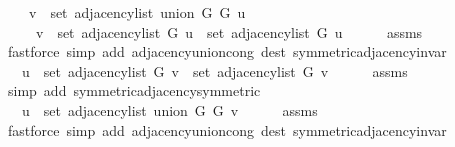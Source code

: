 \begin{isabellebody}
\isanewline
\ \ \ \ {\isachardoublequoteopen}v\ {\isasymin}\ set\ {\isacharparenleft}{\kern0pt}adjacency{\isacharunderscore}{\kern0pt}list\ {\isacharparenleft}{\kern0pt}union\ G{}\ G{}{\isacharparenright}{\kern0pt}\ u{\isacharparenright}{\kern0pt}\ {\isasymlongleftrightarrow}\isanewline
\ \ \ \ \ v\ {\isasymin}\ set\ {\isacharparenleft}{\kern0pt}adjacency{\isacharunderscore}{\kern0pt}list\ G{}\ u{\isacharparenright}{\kern0pt}\ {\isasymunion}\ set\ {\isacharparenleft}{\kern0pt}adjacency{\isacharunderscore}{\kern0pt}list\ G{}\ u{\isacharparenright}{\kern0pt}{\isachardoublequoteclose}\isanewline
\ \ \ \ \isamarkupfalse%
\ assms\isanewline
\ \ \ \ \isamarkupfalse%
\ {\isacharparenleft}{\kern0pt}fastforce\ simp\ add{\isacharcolon}{\kern0pt}\ adjacency{\isacharunderscore}{\kern0pt}union{\isacharunderscore}{\kern0pt}cong\ dest{\isacharcolon}{\kern0pt}\ symmetric{\isacharunderscore}{\kern0pt}adjacency{\isachardot}{\kern0pt}invar{\isacharparenright}{\kern0pt}\isanewline
\ \ \isamarkupfalse%
\ \isamarkupfalse%
\ {\isachardoublequoteopen}{\isachardot}{\kern0pt}{\isachardot}{\kern0pt}{\isachardot}{\kern0pt}\ {\isasymlongleftrightarrow}\ u\ {\isasymin}\ set\ {\isacharparenleft}{\kern0pt}adjacency{\isacharunderscore}{\kern0pt}list\ G{}\ v{\isacharparenright}{\kern0pt}\ {\isasymunion}\ set\ {\isacharparenleft}{\kern0pt}adjacency{\isacharunderscore}{\kern0pt}list\ G{}\ v{\isacharparenright}{\kern0pt}{\isachardoublequoteclose}\isanewline
\ \ \ \ \isamarkupfalse%
\ assms\isanewline
\ \ \ \ \isamarkupfalse%
\ {\isacharparenleft}{\kern0pt}simp\ add{\isacharcolon}{\kern0pt}\ symmetric{\isacharunderscore}{\kern0pt}adjacency{\isachardot}{\kern0pt}symmetric{\isacharparenright}{\kern0pt}\isanewline
\ \ \isamarkupfalse%
\ \isamarkupfalse%
\ {\isachardoublequoteopen}{\isachardot}{\kern0pt}{\isachardot}{\kern0pt}{\isachardot}{\kern0pt}\ {\isasymlongleftrightarrow}\ u\ {\isasymin}\ set\ {\isacharparenleft}{\kern0pt}adjacency{\isacharunderscore}{\kern0pt}list\ {\isacharparenleft}{\kern0pt}union\ G{}\ G{}{\isacharparenright}{\kern0pt}\ v{\isacharparenright}{\kern0pt}{\isachardoublequoteclose}\isanewline
\ \ \ \ \isamarkupfalse%
\ assms\isanewline
\ \ \ \ \isamarkupfalse%
\ {\isacharparenleft}{\kern0pt}fastforce\ simp\ add{\isacharcolon}{\kern0pt}\ adjacency{\isacharunderscore}{\kern0pt}union{\isacharunderscore}{\kern0pt}cong\ dest{\isacharcolon}{\kern0pt}\ symmetric{\isacharunderscore}{\kern0pt}adjacency{\isachardot}{\kern0pt}invar{\isacharparenright}{\kern0pt}\isanewline

\end{isabellebody}
